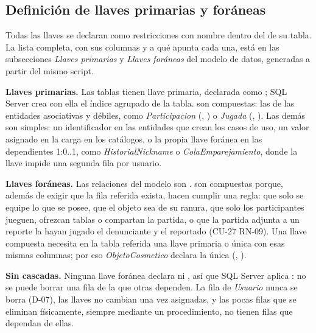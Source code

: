 \subsection*{Definición de llaves primarias y foráneas}

Todas las llaves se declaran como restricciones con nombre dentro del  de su tabla. La lista completa, con sus columnas y a qué apunta cada una, está en las subsecciones \textit{Llaves primarias} y \textit{Llaves foráneas} del modelo de datos, generadas a partir del mismo script.

\begin{reglas}
  \item \textbf{Llaves primarias.} Las \bdNumTablas{} tablas tienen llave primaria, declarada como ; SQL Server crea con ella el índice agrupado de la tabla. \bdNumPkCompuestas{} son compuestas: las de las entidades asociativas y débiles, como \textit{Participacion} (, ) o \textit{Jugada} (, ). Las demás son simples: un identificador  en las entidades que crean los casos de uso, un valor asignado en la carga en los catálogos, o la propia llave foránea en las dependientes 1:0..1, como \textit{HistorialNickname} o \textit{ColaEmparejamiento}, donde la llave impide una segunda fila por usuario.
  \item \textbf{Llaves foráneas.} Las \bdNumForaneas{} relaciones del modelo son . \bdNumFkCompuestas{} son compuestas porque, además de exigir que la fila referida exista, hacen cumplir una regla: que solo se equipe lo que se posee, que el objeto sea de su ranura, que solo los participantes jueguen, ofrezcan tablas o compartan la partida, o que la partida adjunta a un reporte la hayan jugado el denunciante y el reportado (\mbox{CU-27} \mbox{RN-09}). Una llave compuesta necesita en la tabla referida una llave primaria o única con esas mismas columnas; por eso \textit{ObjetoCosmetico} declara la única (, ).
  \item \textbf{Sin cascadas.} Ninguna llave foránea declara  ni , así que SQL Server aplica : no se puede borrar una fila de la que otras dependen. La fila de \textit{Usuario} nunca se borra (\mbox{D-07}), las llaves no cambian una vez asignadas, y las pocas filas que se eliminan físicamente, siempre mediante un procedimiento, no tienen filas que dependan de ellas.
\end{reglas}

